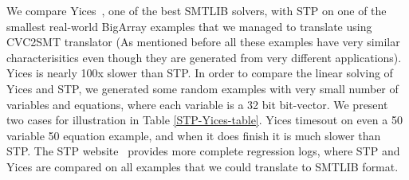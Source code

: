 We compare Yices~\cite{yices}, one of the best SMTLIB solvers, with
STP on one of the smallest real-world BigArray examples that we
managed to translate using CVC2SMT translator (As mentioned before all
these examples have very similar characterisitics even though they are
generated from very different applications).  Yices is nearly 100x
slower than STP. In order to compare the linear solving of Yices and
STP, we generated some random examples with very small number of
variables and equations, where each variable is a 32 bit
bit-vector. We present two cases for illustration in Table
\ref{STP-Yices-table}. Yices timesout on even a 50 variable 50
equation example, and when it does finish it is much slower than
STP. The STP website~\cite{stpwebsite} provides more complete
regression logs, where STP and Yices are compared on all examples that
we could translate to SMTLIB format.

